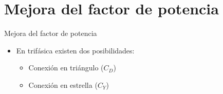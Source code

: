 \documentclass[aspectratio=169, xcolor={usenames,svgnames,dvipsnames}]{beamer}
\begin{document}
\section{Mejora del factor de potencia}

\begin{frame}{Mejora del factor de potencia}
    \begin{itemize}
\item En trifásica existen dos posibilidades:
\begin{itemize}
\item Conexión en triángulo (\(C_D\))
\item Conexión en estrella (\(C_Y\))
\end{itemize}
\end{itemize}
\end{frame}
\end{document}
